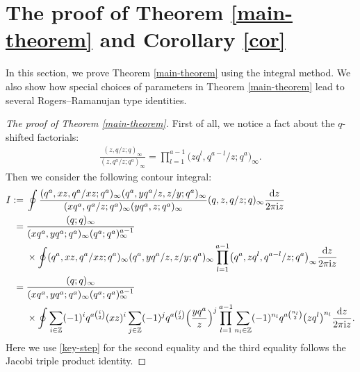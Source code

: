 \documentclass[pdftex]{sigma}
\numberwithin{equation}{section}
\theoremstyle{definition}
\begin{document}
\section{The proof of Theorem \ref{main-theorem} and Corollary \ref{cor}}\label{proof}
In this section, we prove Theorem \ref{main-theorem} using the integral method. We also show how special choices of parameters in Theorem \ref{main-theorem} lead to several Rogers--Ramanujan type identities.
\begin{proof}[The proof of Theorem \ref{main-theorem}]
First of all, we notice a fact about the $q$-shifted factorials:
\begin{align}\label{key-step}
\frac{(z,q/z;q)_{\infty}}{(z,q^a/z;q^a)_{\infty}}=\prod_{l=1}^{a-1}\bigl(zq^l,q^{a-l}/z;q^a\bigr)_{\infty}.
\end{align}
Then we consider the following contour integral:
\begin{align*}
I:={}&\oint \frac{(q^a,xz,q^a/xz;q^a)_{\infty}(q^a,yq^a/z,z/y;q^a)_{\infty}} {(xq^a,q^a/z;q^a)_{\infty}(yq^a,z;q^a)_{\infty}}(q,z,q/z;q)_{\infty}\frac{{\rm d}z}{2\pi {\rm i}z}\\
={}&\frac{(q;q)_{\infty}}{(xq^a,yq^a;q^a)_{\infty}(q^a;q^a)^{a-1}_{\infty}} \\ & \times\oint(q^a,xz,q^a/xz;q^a)_{\infty}(q^a,yq^a/z,z/y;q^a)_{\infty}
\prod_{l=1}^{a-1}\bigl(q^a,zq^l,q^{a-l}/z;q^a\bigr)_{\infty}\frac{{\rm d}z}{2\pi {\rm i}z}\\
={}& \frac{(q;q)_{\infty}}{(xq^a,yq^a;q^a)_{\infty}(q^a;q^a)^{a-1}_{\infty}}\\
& \times\oint\sum_{i\in\mathbb{Z}}(-1)^iq^{a\binom{i}{2}}(xz)^i\sum_{j\in\mathbb{Z}} (-1)^jq^{a\binom{j}{2}}\Bigl(\frac{yq^a}{z}\Bigr)^j
\prod_{l=1}^{a-1}\sum_{n_l\in\mathbb{Z}}(-1)^{n_l}q^{a\binom{n_l}{2}}\bigl(zq^l\bigr)^{n_l}\frac{{\rm d}z}{2\pi {\rm i}z}.
\end{align*}
Here we use \eqref{key-step} for the second equality and the third equality follows the Jacobi triple product identity.


\end{proof}
\end{document}
